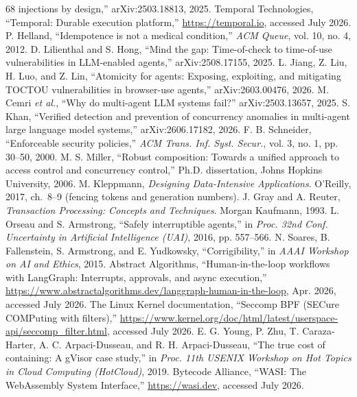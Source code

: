 \documentclass[10pt,journal,compsoc]{IEEEtran}
\begin{document}
\begin{thebibliography}{68}
injections by design,'' arXiv:2503.18813, 2025.
 Temporal Technologies, ``Temporal: Durable execution
platform,'' \url{https://temporal.io}, accessed July 2026.
 P. Helland, ``Idempotence is not a medical condition,''
\emph{ACM Queue}, vol. 10, no. 4, 2012.
 D. Lilienthal and S. Hong, ``Mind the gap:
Time-of-check to time-of-use vulnerabilities in LLM-enabled agents,''
arXiv:2508.17155, 2025.
 L. Jiang, Z. Liu, H. Luo, and Z. Lin, ``Atomicity
for agents: Exposing, exploiting, and mitigating TOCTOU vulnerabilities in
browser-use agents,'' arXiv:2603.00476, 2026.
 M. Cemri \emph{et al.}, ``Why do multi-agent LLM systems
fail?'' arXiv:2503.13657, 2025.
 S. Khan, ``Verified detection and prevention of concurrency
anomalies in multi-agent large language model systems,'' arXiv:2606.17182,
2026.
 F. B. Schneider, ``Enforceable security policies,''
\emph{ACM Trans. Inf. Syst. Secur.}, vol. 3, no. 1, pp. 30--50, 2000.
 M. S. Miller, ``Robust composition: Towards a unified
approach to access control and concurrency control,'' Ph.D. dissertation,
Johns Hopkins University, 2006.
 M. Kleppmann, \emph{Designing Data-Intensive
Applications}. O'Reilly, 2017, ch.~8--9 (fencing tokens and generation
numbers).
 J. Gray and A. Reuter, \emph{Transaction Processing:
Concepts and Techniques}. Morgan Kaufmann, 1993.
 L. Orseau and S. Armstrong, ``Safely interruptible
agents,'' in \emph{Proc. 32nd Conf. Uncertainty in Artificial Intelligence
(UAI)}, 2016, pp. 557--566.
 N. Soares, B. Fallenstein, S. Armstrong, and
E. Yudkowsky, ``Corrigibility,'' in \emph{AAAI Workshop on AI and Ethics},
2015.
 Abstract Algorithms, ``Human-in-the-loop workflows
with LangGraph: Interrupts, approvals, and async execution,''
\url{https://www.abstractalgorithms.dev/langgraph-human-in-the-loop},
Apr. 2026, accessed July 2026.
 The Linux Kernel documentation, ``Seccomp BPF (SECure
COMPuting with filters),''
\url{https://www.kernel.org/doc/html/latest/userspace-api/seccomp_filter.html},
accessed July 2026.
 E. G. Young, P. Zhu, T. Caraza-Harter,
A. C. Arpaci-Dusseau, and R. H. Arpaci-Dusseau, ``The true cost of
containing: A gVisor case study,'' in \emph{Proc. 11th USENIX Workshop on
Hot Topics in Cloud Computing (HotCloud)}, 2019.
 Bytecode Alliance, ``WASI: The WebAssembly System
Interface,'' \url{https://wasi.dev}, accessed July 2026.

\end{thebibliography}
\end{document}
